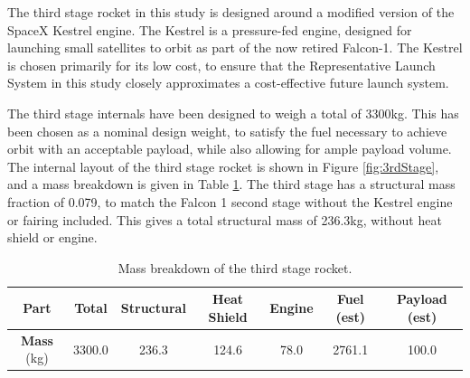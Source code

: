   The third stage rocket in this study is designed around a modified version of the SpaceX Kestrel engine. The Kestrel is a pressure-fed engine, designed for launching small satellites to orbit as part of the now retired Falcon-1. The Kestrel is chosen primarily for its low cost, to ensure that the Representative Launch System in this study closely approximates a cost-effective future launch system.  
   
 The third stage internals have been designed to weigh a total of 3300kg. This has been chosen as a nominal design weight, to satisfy the fuel necessary to achieve orbit with an acceptable payload, while also allowing for ample payload volume. The internal layout of the third stage rocket is shown in Figure \ref{fig:3rdStage}, and a mass breakdown is given in Table \ref{tab:MassBreakdown3}. The third stage has a structural mass fraction of 0.079, to match the Falcon 1 second stage without the Kestrel engine or fairing included\cite{Vehicle2008}. This gives a total structural mass of 236.3kg, without heat shield or engine. 
	\begin{table}[h]
		\centering
		\begin{tabular}{|c|c|c|c|c|c|c|}
			\hline  \textbf{Part} & Total & Structural & Heat Shield & Engine & Fuel (est) & Payload (est) \\ 
			\hline \textbf{Mass} (kg) & 3300.0  & 236.3  & 124.6  & 78.0  & 2761.1 & 100.0\\ 
			\hline 
		\end{tabular} 
		\caption{Mass breakdown of the third stage rocket.} %
		\label{tab:MassBreakdown3}
	\end{table}
 
 

